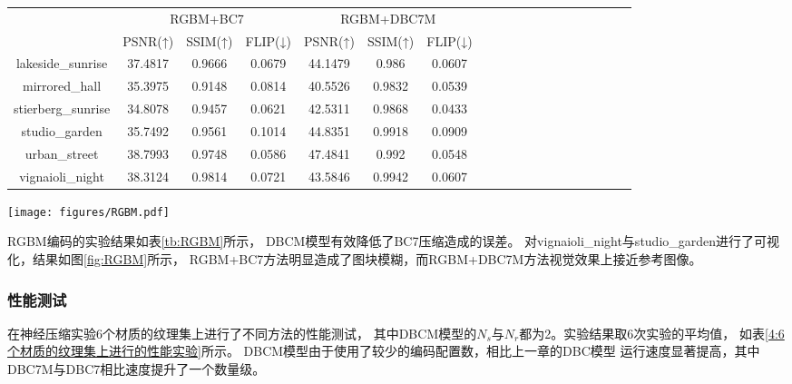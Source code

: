 \begin{table*}[htbp]
    \caption{6个HDR图像上进行的对比实验}
    \label{tb:RGBM}
    \begin{center}
    \begin{tabular}{ccccccccccccccccccc}
    \toprule
                    & \multicolumn{3}{c}{RGBM+BC7}  & \multicolumn{3}{c}{RGBM+DBC7M}  \\ 
                    & PSNR(↑)   & SSIM(↑) & FLIP(↓)&PSNR(↑)& SSIM(↑) & FLIP(↓) \\
    \midrule
lakeside\_sunrise    & 37.4817   & 0.9666 & 0.0679 &44.1479&0.986&0.0607 \\
mirrored\_hall       & 35.3975   & 0.9148 & 0.0814 &40.5526&0.9832&0.0539 \\
stierberg\_sunrise   & 34.8078   & 0.9457 & 0.0621 &42.5311&0.9868&0.0433 \\
studio\_garden       & 35.7492   & 0.9561 & 0.1014 &44.8351&0.9918&0.0909 \\
urban\_street        & 38.7993   & 0.9748 & 0.0586 &47.4841&0.992&0.0548 \\
vignaioli\_night     & 38.3124   & 0.9814 & 0.0721 &43.5846&0.9942&0.0607 \\
    \bottomrule
    \end{tabular}
    \end{center}
\end{table*}

\begin{figure*}[htbp]
    \centering
    \texttt{[image: figures/RGBM.pdf]}
    \caption{两个HDR纹理的可视化实验}
    \label{fig:RGBM} 
\end{figure*}

RGBM编码的实验结果如表\ref{tb:RGBM}所示，
DBCM模型有效降低了BC7压缩造成的误差。
对vignaioli\_night与studio\_garden进行了可视化，结果如图\ref{fig:RGBM}所示，
RGBM+BC7方法明显造成了图块模糊，而RGBM+DBC7M方法视觉效果上接近参考图像。


\subsubsection{性能测试}

在神经压缩实验6个材质的纹理集上进行了不同方法的性能测试，
其中DBCM模型的$N_s$与$N_r$都为2。实验结果取6次实验的平均值，
如表\ref{4:6个材质的纹理集上进行的性能实验}所示。
DBCM模型由于使用了较少的编码配置数，相比上一章的DBC模型
运行速度显著提高，其中DBC7M与DBC7相比速度提升了一个数量级。

